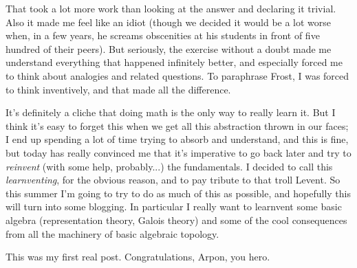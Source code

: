 That took a lot more work than looking at the answer and declaring it
trivial. Also it made me feel like an idiot (though we decided it
would be a lot worse when, in a few years, he screams obscenities at
his students in front of five hundred of their peers). But seriously,
the exercise without a doubt made me understand everything that
happened infinitely better, and especially forced me to think about
analogies and related questions. To paraphrase Frost, I was forced to
think inventively, and that made all the difference.

It's definitely a cliche that doing math is the only way to really
learn it. But I think it's easy to forget this when we get all this
abstraction thrown in our faces; I end up spending a lot of time
trying to absorb and understand, and this is fine, but today has
really convinced me that it's imperative to go back later and try to
\emph{reinvent} (with some help, probably...) the fundamentals. I
decided to call this \emph{learnventing}, for the obvious reason, and
to pay tribute to that troll Levent. So this summer I'm going to try
to do as much of this as possible, and hopefully this will turn into
some blogging. In particular I really want to learnvent some basic
algebra (representation theory, Galois theory) and some of the cool
consequences from all the machinery of basic algebraic topology.

This was my first real post. Congratulations, Arpon, you hero.
